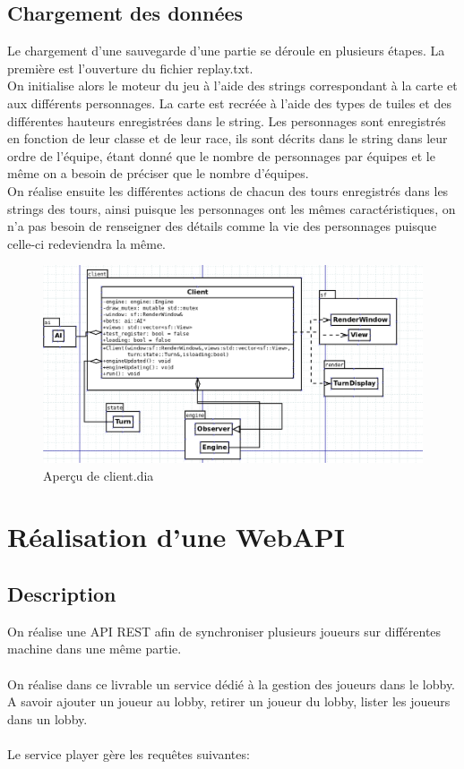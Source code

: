 \subsection{Chargement des données}
Le chargement d'une sauvegarde d'une partie se déroule en 
plusieurs étapes. La première est l'ouverture du fichier 
replay.txt.
\\
On initialise alors le moteur du jeu à l'aide des strings 
correspondant à la carte et aux différents personnages. La 
carte est recréée à l'aide des types de tuiles et des 
différentes hauteurs enregistrées dans le string. Les 
personnages sont enregistrés en fonction de leur classe et 
de leur race, ils sont décrits dans le string dans leur 
ordre de l'équipe, étant donné que le nombre de personnages 
par équipes et le même on a besoin de préciser que le nombre 
d'équipes.
\\
On réalise ensuite les différentes actions de chacun des 
tours enregistrés dans les strings des tours, ainsi puisque 
les personnages ont les mêmes caractéristiques, on n'a pas 
besoin de renseigner des détails comme la vie des 
personnages puisque celle-ci redeviendra la même.


\begin{figure}[H]
\includegraphics[width=\linewidth]{images/client_dia.png}
\centering
\caption{Aperçu de client.dia}
\label{fig:img6}
\end{figure}
\newpage

\section{Réalisation d'une WebAPI}

\subsection{Description}
On réalise une API REST afin de synchroniser plusieurs 
joueurs sur différentes machine dans une même partie.
\\\\
On réalise dans ce livrable un service dédié à la gestion 
des joueurs dans le lobby. A savoir ajouter un joueur au 
lobby, retirer un joueur du lobby, lister les 
joueurs dans un lobby.
\\\\
Le service player gère les requêtes suivantes:

